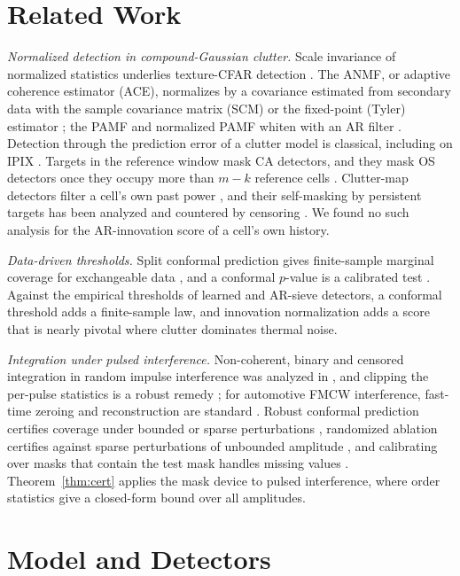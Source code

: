 \documentclass[journal]{IEEEtran}
\begin{document}
\section{Related Work}
\emph{Normalized detection in compound-Gaussian clutter.} Scale invariance of normalized statistics underlies texture-CFAR detection \cite{conte1995,kraut1999,ollila2012}. The ANMF, or adaptive coherence estimator (ACE), normalizes by a covariance estimated from secondary data with the sample covariance matrix (SCM) \cite{kraut1999} or the fixed-point (Tyler) estimator \cite{pascal2008fp}; the PAMF and normalized PAMF whiten with an AR filter \cite{roman2000,michels2000}. Detection through the prediction error of a clutter model is classical, including on IPIX \cite{haykin1995}. Targets in the reference window mask CA detectors, and they mask OS detectors once they occupy more than $m-k$ reference cells \cite{rohling1983,gandhi1988}. Clutter-map detectors filter a cell's own past power \cite{lops1989}, and their self-masking by persistent targets has been analyzed and countered by censoring \cite{naldi1999}. We found no such analysis for the AR-innovation score of a cell's own history.

\emph{Data-driven thresholds.} Split conformal prediction gives finite-sample marginal coverage for exchangeable data \cite{lei2018,vovk2012}, and a conformal $p$-value is a calibrated test \cite{bates2023}. Against the empirical thresholds of learned and AR-sieve detectors, a conformal threshold adds a finite-sample law, and innovation normalization adds a score that is nearly pivotal where clutter dominates thermal noise.

\emph{Integration under pulsed interference.} Non-coherent, binary and censored integration in random impulse interference was analyzed in \cite{himonas1994api}, and clipping the per-pulse statistics is a robust remedy \cite{abbasi2018clip}; for automotive FMCW interference, fast-time zeroing and reconstruction are standard \cite{toth2019comp,rameez2021ar}. Robust conformal prediction certifies coverage under bounded or sparse perturbations \cite{gendler2022arcp,zargarbashi2024robust}, randomized ablation certifies against sparse perturbations of unbounded amplitude \cite{levine2020ablation}, and calibrating over masks that contain the test mask handles missing values \cite{zaffran2023missing}. Theorem~\ref{thm:cert} applies the mask device to pulsed interference, where order statistics give a closed-form bound over all amplitudes.

\section{Model and Detectors}\label{sec:model}
\end{document}
